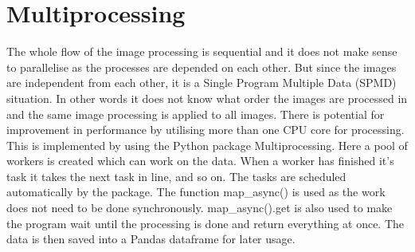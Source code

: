 \section{Multiprocessing}
The whole flow of the image processing is sequential and it does not make sense to parallelise as the processes are depended on each other. But since the images are independent from each other, it is a Single Program Multiple Data (SPMD) situation. In other words it does not know what order the images are processed in and the same image processing is applied to all images. There is potential for improvement in performance by utilising more than one CPU core for processing. This is implemented by using the Python package Multiprocessing. Here a pool of workers is created which can work on the data. When a worker has finished it's task it takes the next task in line, and so on. The tasks are scheduled automatically by the package. The function map_async() is used as the work does not need to be done synchronously. map_async().get is also used to make the program wait until the processing is done and return everything at once. The data is then saved into a Pandas dataframe for later usage.